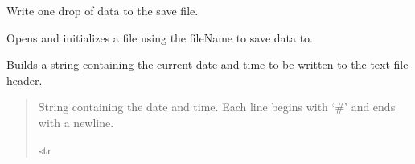 \documentclass[letterpaper,10pt,english]{sphinxmanual}
\begin{document}
\begin{fulllineitems}
\begin{fulllineitems}
\end{fulllineitems}


\begin{fulllineitems}
\label{\detokenize{PodApi.Stream.Drain:PodApi.Stream.Drain.ToText.DrainToTXT.DrainDropToFile}}
\pysigstartsignatures
{}
\pysigstopsignatures
\sphinxAtStartPar
Write one drop of data to the save file.

\end{fulllineitems}


\begin{fulllineitems}
\label{\detokenize{PodApi.Stream.Drain:PodApi.Stream.Drain.ToText.DrainToTXT.OpenFile}}
\pysigstartsignatures
{}
\pysigstopsignatures
\sphinxAtStartPar
Opens and initializes a file using the fileName to save data to.

\end{fulllineitems}


\begin{fulllineitems}
\label{\detokenize{PodApi.Stream.Drain:PodApi.Stream.Drain.ToText.DrainToTXT._GetTimeHeader}}
\pysigstartsignatures
{}
\pysigstopsignatures
\sphinxAtStartPar
Builds a string containing the current date and time to be written to the text file header.
\begin{quote}\begin{description}
\sphinxAtStartPar
String containing the date and time. Each line begins with ‘\#’ and ends with a newline.

\sphinxAtStartPar
str

\end{description}\end{quote}

\end{fulllineitems}


\end{fulllineitems}
\end{document}
